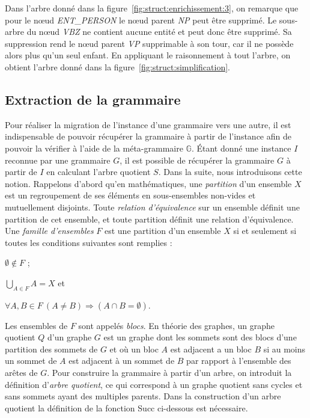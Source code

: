 \begin{example}
    Dans l'arbre donné dans la figure~\ref{fig:struct:enrichissement:3}, on remarque que pour le nœud \emph{ENT\_PERSON} le nœud parent \emph{NP} peut être supprimé.
    Le sous-arbre du nœud \emph{VBZ} ne contient aucune entité et peut donc être supprimé.
    Sa suppression rend le nœud parent \emph{VP} supprimable à son tour, car il ne possède alors plus qu'un seul enfant.
    En appliquant le raisonnement à tout l'arbre, on obtient l'arbre donné dans la figure~\ref{fig:struct:simplification}.
\end{example}

\subsection{Extraction de la grammaire}
\label{sec:struct:steps:grammar}

Pour réaliser la migration de l'instance d'une grammaire vers une autre, il est indispensable de pouvoir récupérer la grammaire à partir de l'instance afin de pouvoir la vérifier à l'aide de la méta-grammaire $\mathbb{G}$.
Étant donné une instance $I$ reconnue par une grammaire $G$, il est possible de récupérer la grammaire $G$ à partir de $I$ en calculant l'arbre quotient $S$.
Dans la suite, nous introduisons cette notion.
Rappelons d'abord qu'en mathématiques, une \emph{partition} d'un ensemble $X$ est un regroupement de ses éléments en sous-ensembles non-vides et mutuellement disjoints.
Toute \emph{relation d'équivalence} sur un ensemble définit une partition de cet ensemble, et toute partition définit une relation d'équivalence.
Une \emph{famille d'ensembles} $F$ est une partition d'un ensemble $X$ si et seulement si toutes les conditions suivantes sont remplies :
\begin{enumerate*}[label=(\roman*)]
    \item $\emptyset \not\in F$ ;
    \item $\bigcup_{A \in F}A = X$ et
    \item $\forall A, B  \in F~ (A \neq B) \Rightarrow ( A \cap B = \emptyset)$.
\end{enumerate*}
Les ensembles de $F$ sont appelés \textit{blocs}.
En théorie des graphes, un graphe quotient $Q$ d'un graphe $G$ est un graphe dont les sommets sont des blocs d'une partition des sommets de $G$ et où un bloc $A$ est adjacent a un bloc $B$ si au moins un sommet de $A$ est adjacent à un sommet de $B$ par rapport à l'ensemble des arêtes de $G$.
Pour construire la grammaire à partir d'un arbre, on introduit la définition d'\textit{arbre quotient}, ce qui correspond à un graphe quotient sans cycles et sans sommets ayant des multiples parents.
Dans la construction d'un arbre quotient la définition de la fonction \textsf{Succ} ci-dessous est nécessaire.

